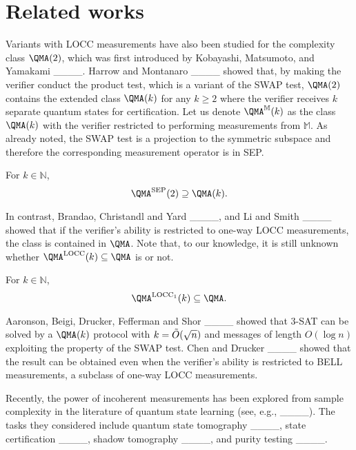 \section{Related works}
\label{sec:related}

Variants with LOCC measurements have also been studied for the complexity class $\QMA(2)$, which was first introduced by Kobayashi, Matsumoto, and Yamakami ____. Harrow and Montanaro ____ showed that, by making the verifier conduct the product test, which is a variant of the SWAP test, $\QMA(2)$ contains the extended class $\QMA(k)$ for any $k\geq 2$ where the verifier receives $k$ separate quantum states for certification. Let us denote $\QMA^\mathbb{M}(k)$ as the class $\QMA(k)$ with the verifier restricted to performing measurements from $\mathbb{M}$. As already noted, the SWAP test is a projection to the symmetric subspace and therefore the corresponding measurement operator is in SEP.

\begin{theorem}
For $k \in \mathbb{N}$,
\[
    \QMA^\mathrm{SEP}(2) \supseteq \QMA(k).
\]
\end{theorem}

In contrast, Brandao, Christandl and Yard ____, and Li and Smith ____ showed that if the verifier's ability is restricted to one-way LOCC measurements, the class is contained in $\QMA$. Note that, to our knowledge, it is still unknown whether $\QMA^{\mathrm{LOCC}}(k) \subseteq \QMA$ is or not.

\begin{theorem}
For $k \in \mathbb{N}$,
\[
    \QMA^{\mathrm{LOCC}_1}(k) \subseteq \QMA.
\]    
\end{theorem}

Aaronson, Beigi, Drucker, Fefferman and Shor ____ showed that 3-SAT can be solved by a $\QMA(k)$ protocol with $k=\Tilde{O}(\sqrt{n})$ and messages of length $O(\log n)$ exploiting the property of the SWAP test. Chen and Drucker ____ showed that the result can be obtained even when the verifier's ability is restricted to BELL measurements, a subclass of one-way LOCC measurements. 

Recently, the power of incoherent measurements has been explored from sample complexity in the literature of quantum state learning (see, e.g., ____). The tasks they considered include quantum state tomography ____, state certification ____, shadow tomography ____, and purity testing ____.

